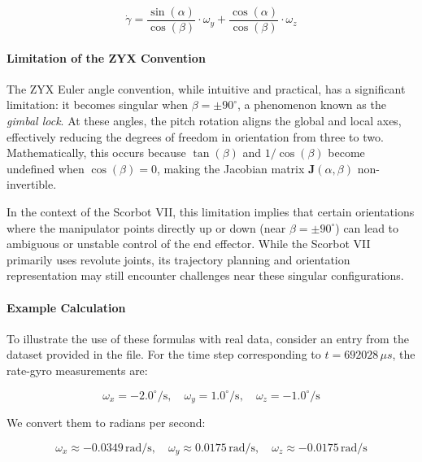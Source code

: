 \documentclass[12pt]{article}
\begin{document}
\begin{equation}
\label{eq:gamma_dot}
\dot{\gamma} = \frac{\sin(\alpha)}{\cos(\beta)} \cdot \omega_y + \frac{\cos(\alpha)}{\cos(\beta)} \cdot \omega_z
\end{equation}

\paragraph{Limitation of the ZYX Convention}
The ZYX Euler angle convention, while intuitive and practical, has a significant limitation: it becomes singular when \(\beta = \pm 90^\circ\), a phenomenon known as the \textit{gimbal lock}. At these angles, the pitch rotation aligns the global and local axes, effectively reducing the degrees of freedom in orientation from three to two. Mathematically, this occurs because \(\tan(\beta)\) and \(1/\cos(\beta)\) become undefined when \(\cos(\beta) = 0\), making the Jacobian matrix \(\mathbf{J}(\alpha, \beta)\) non-invertible.

In the context of the Scorbot VII, this limitation implies that certain orientations where the manipulator points directly up or down (near \(\beta = \pm 90^\circ\)) can lead to ambiguous or unstable control of the end effector. While the Scorbot VII primarily uses revolute joints, its trajectory planning and orientation representation may still encounter challenges near these singular configurations.

\paragraph{Example Calculation}
To illustrate the use of these formulas with real data, consider an entry from the dataset provided in the file. For the time step corresponding to \( t = 692028 \, \mu s \), the rate-gyro measurements are:

\begin{equation}
\label{eq:rate-gyro}
\omega_x = -2.0^\circ/\text{s}, \quad \omega_y = 1.0^\circ/\text{s}, \quad \omega_z = -1.0^\circ/\text{s}
\end{equation}

We convert them to radians per second:

\begin{equation}
\label{eq:rate-gyro-rad}
\omega_x \approx -0.0349 \, \text{rad/s}, \quad \omega_y \approx 0.0175 \, \text{rad/s}, \quad \omega_z \approx -0.0175 \, \text{rad/s}
\end{equation}
\end{document}
